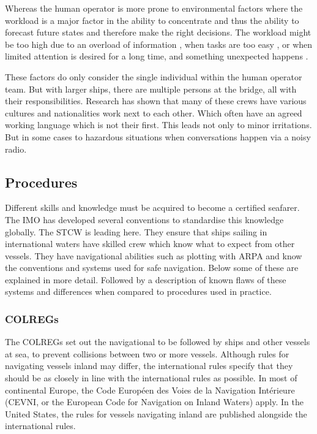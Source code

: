 Whereas the human operator is more prone to environmental factors where the workload is a major factor in the ability to concentrate and thus the ability to forecast future states and therefore make the right decisions. The workload might be too high due to an overload of information \cite{Speier1999}, when tasks are too easy \cite{Washburn2001}, or when limited attention is desired for a long time, and something unexpected happens \cite{McMorris2018}.

These factors do only consider the single individual within the human operator team. But with larger ships, there are multiple persons at the bridge, all with their responsibilities. Research has shown that many of these crews have various cultures and nationalities work next to each other. Which often have an agreed working language which is not their first. This leads not only to minor irritations. But in some cases to hazardous situations \cite{Hetherington2006} when conversations happen via a noisy radio. 

\subsection{Procedures}
\label{apps:procedures}
Different skills and knowledge must be acquired to become a certified seafarer. The \ac{IMO} has developed several conventions to standardise this knowledge globally. The \ac{STCW} is leading here. They ensure that ships sailing in international waters have skilled crew which know what to expect from other vessels. They have navigational abilities such as plotting with \ac{ARPA} and know the conventions and systems used for safe navigation. Below some of these are explained in more detail. Followed by a description of known flaws of these systems and differences when compared to procedures used in practice.

\clearpage
\subsubsection{\acf{COLREGs}}
The \ac{COLREGs} set out the navigational to be followed by ships and other vessels at sea, to prevent collisions between two or more vessels. Although rules for navigating vessels inland may differ, the international rules specify that they should be as closely in line with the international rules as possible. In most of continental Europe, the Code Européen des Voies de la Navigation Intérieure (CEVNI, or the European Code for Navigation on Inland Waters) apply. In the United States, the rules for vessels navigating inland are published alongside the international rules.

